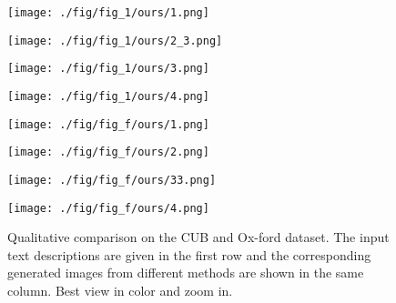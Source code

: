 \documentclass{article}
\begin{document}
\begin{figure*}[t!h]
		\begin{minipage}[c]{0.01\textwidth}
		\end{minipage}
		\hfill
		\begin{minipage}{0.115\textwidth}
			\texttt{[image: ./fig/fig\_1/ours/1.png]}
		\end{minipage}
		\hfill
		\begin{minipage}{0.115\textwidth}
			\texttt{[image: ./fig/fig\_1/ours/2\_3.png]}
		\end{minipage}
		\hfill
		\begin{minipage}{0.115\textwidth}
			\texttt{[image: ./fig/fig\_1/ours/3.png]}
		\end{minipage}
		\hfill
		\begin{minipage}{0.115\textwidth}
			\texttt{[image: ./fig/fig\_1/ours/4.png]}
		\end{minipage}
\hspace{1pt}
		\begin{minipage}{0.115\textwidth}
			\texttt{[image: ./fig/fig\_f/ours/1.png]}
		\end{minipage}
		\hfill
		\begin{minipage}{0.115\textwidth}
			\texttt{[image: ./fig/fig\_f/ours/2.png]}
		\end{minipage}
		\hfill
		\begin{minipage}{0.115\textwidth}
			\texttt{[image: ./fig/fig\_f/ours/33.png]}
		\end{minipage}
		\hfill
		\begin{minipage}{0.115\textwidth}
			\texttt{[image: ./fig/fig\_f/ours/4.png]}
		\end{minipage}
		\vspace{2pt}
		\caption{Qualitative comparison on the CUB and Ox-ford dataset. The input text descriptions are given in the first row and the corresponding generated images from different methods are shown in the same column. Best view in color and zoom in.}
		\label{fig:qualitative_cub}
		\vspace{-4mm}
	\end{figure*}
\end{document}
